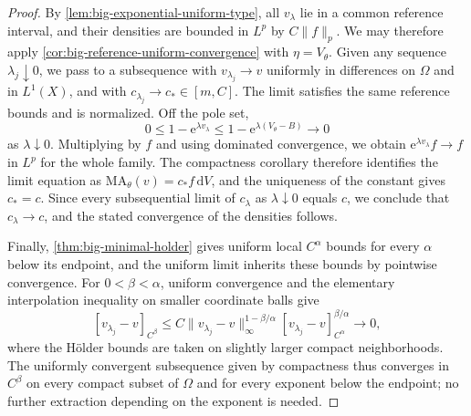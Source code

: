 \begin{proof}
By \cref{lem:big-exponential-uniform-type}, all $v_\lambda$ lie in a common reference interval, and their densities are bounded in $L^p$ by $C\|f\|_p$. We may therefore apply \cref{cor:big-reference-uniform-convergence} with $\eta=V_\theta$. Given any sequence $\lambda_j\downarrow0$, we pass to a subsequence with $v_{\lambda_j}\to v$ uniformly in differences on $\Omega$ and in $L^1(X)$, and with $c_{\lambda_j}\to c_*\in[m,C]$. The limit satisfies the same reference bounds and is normalized. Off the pole set,
\[
 0\leq1-\mathrm{e}^{\lambda v_\lambda}
 \leq1-\mathrm{e}^{\lambda(V_\theta-B)}\longrightarrow0
\]
as $\lambda\downarrow0$. Multiplying by $f$ and using dominated convergence, we obtain $\mathrm{e}^{\lambda v_\lambda}f\to f$ in $L^p$ for the whole family. The compactness corollary therefore identifies the limit equation as $\mathrm{MA}_\theta(v)=c_*f\,\mathrm{d}V$, and the uniqueness of the constant gives $c_*=c$. Since every subsequential limit of $c_\lambda$ as $\lambda\downarrow0$ equals $c$, we conclude that $c_\lambda\to c$, and the stated convergence of the densities follows.

Finally, \cref{thm:big-minimal-holder} gives uniform local $C^\alpha$ bounds for every $\alpha$ below its endpoint, and the uniform limit inherits these bounds by pointwise convergence. For $0<\beta<\alpha$, uniform convergence and the elementary interpolation inequality on smaller coordinate balls give
\[
 [v_{\lambda_j}-v]_{C^\beta}
 \leq C\|v_{\lambda_j}-v\|_\infty^{1-\beta/\alpha}
          [v_{\lambda_j}-v]_{C^\alpha}^{\beta/\alpha}
 \longrightarrow0,
\]
where the H\"older bounds are taken on slightly larger compact neighborhoods. The uniformly convergent subsequence given by compactness thus converges in $C^\beta$ on every compact subset of $\Omega$ and for every exponent below the endpoint; no further extraction depending on the exponent is needed.
\end{proof}

